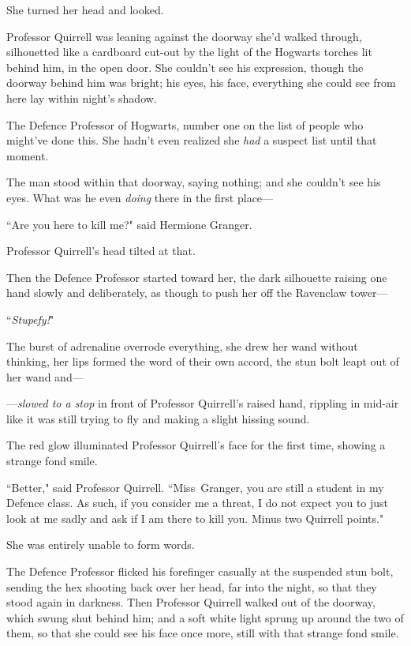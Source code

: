She turned her head and looked.

Professor Quirrell was leaning against the doorway she'd walked through, silhouetted like a cardboard cut-out by the light of the Hogwarts torches lit behind him, in the open door. She couldn't see his expression, though the doorway behind him was bright; his eyes, his face, everything she could see from here lay within night's shadow.

The Defence Professor of Hogwarts, number one on the list of people who might've done this. She hadn't even realized she \emph{had} a suspect list until that moment.

The man stood within that doorway, saying nothing; and she couldn't see his eyes. What was he even \emph{doing} there in the first place—

``Are you here to kill me?" said Hermione Granger.

Professor Quirrell's head tilted at that.

Then the Defence Professor started toward her, the dark silhouette raising one hand slowly and deliberately, as though to push her off the Ravenclaw tower—

``\emph{Stupefy!}"

The burst of adrenaline overrode everything, she drew her wand without thinking, her lips formed the word of their own accord, the stun bolt leapt out of her wand and—

—\emph{slowed to a stop} in front of Professor Quirrell's raised hand, rippling in mid-air like it was still trying to fly and making a slight hissing sound.

The red glow illuminated Professor Quirrell's face for the first time, showing a strange fond smile.

``Better," said Professor Quirrell. ``Miss~Granger, you are still a student in my Defence class. As such, if you consider me a threat, I do not expect you to just look at me sadly and ask if I am there to kill you. Minus two Quirrell points."

She was entirely unable to form words.

The Defence Professor flicked his forefinger casually at the suspended stun bolt, sending the hex shooting back over her head, far into the night, so that they stood again in darkness. Then Professor Quirrell walked out of the doorway, which swung shut behind him; and a soft white light sprung up around the two of them, so that she could see his face once more, still with that strange fond smile.

